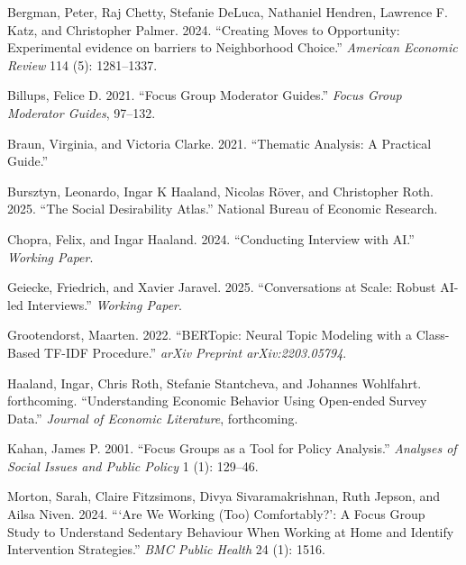 \documentclass[
  letterpaper,
  DIV=11,
  numbers=noendperiod]{scrartcl}
\newlength{\cslhangindent}
\newenvironment{CSLReferences}[2] %
 {\begin{list}{}{%
  \setlength{\itemindent}{0pt}
  \setlength{\leftmargin}{0pt}
  \setlength{\parsep}{0pt}
  \ifodd #1
   \setlength{\leftmargin}{\cslhangindent}
   \setlength{\itemindent}{-1\cslhangindent}
  \fi
  \setlength{\itemsep}{#2\baselineskip}}}
 {\end{list}}
\begin{document}
\label{refs}
\begin{CSLReferences}{1}{0}
Bergman, Peter, Raj Chetty, Stefanie DeLuca, Nathaniel Hendren, Lawrence
F. Katz, and Christopher Palmer. 2024. {``{Creating Moves to
Opportunity: Experimental evidence on barriers to Neighborhood
Choice}.''} \emph{American Economic Review} 114 (5): 1281--1337.

Billups, Felice D. 2021. {``Focus Group Moderator Guides.''} \emph{Focus
Group Moderator Guides}, 97--132.

Braun, Virginia, and Victoria Clarke. 2021. {``Thematic Analysis: A
Practical Guide.''}

Bursztyn, Leonardo, Ingar K Haaland, Nicolas Röver, and Christopher
Roth. 2025. {``The Social Desirability Atlas.''} National Bureau of
Economic Research.

Chopra, Felix, and Ingar Haaland. 2024. {``{Conducting Interview with
AI}.''} \emph{Working Paper}.

Geiecke, Friedrich, and Xavier Jaravel. 2025. {``{Conversations at
Scale: Robust AI-led Interviews}.''} \emph{Working Paper}.

Grootendorst, Maarten. 2022. {``BERTopic: Neural Topic Modeling with a
Class-Based TF-IDF Procedure.''} \emph{arXiv Preprint arXiv:2203.05794}.

Haaland, Ingar, Chris Roth, Stefanie Stantcheva, and Johannes Wohlfahrt.
forthcoming. {``{Understanding Economic Behavior Using Open-ended Survey
Data}.''} \emph{Journal of Economic Literature}, forthcoming.

Kahan, James P. 2001. {``Focus Groups as a Tool for Policy Analysis.''}
\emph{Analyses of Social Issues and Public Policy} 1 (1): 129--46.

Morton, Sarah, Claire Fitzsimons, Divya Sivaramakrishnan, Ruth Jepson,
and Ailsa Niven. 2024. {``{`Are We Working (Too) Comfortably?'}: A Focus
Group Study to Understand Sedentary Behaviour When Working at Home and
Identify Intervention Strategies.''} \emph{BMC Public Health} 24 (1):
1516.


\end{CSLReferences}
\end{document}
